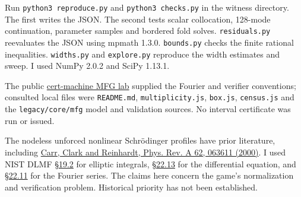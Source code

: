 \documentclass[11pt]{article}
\newcommand{\topic}[1]{\smallskip{\bfseries\sffamily\color{accent}#1}\par\nobreak}
\begin{document}
\topic{Code and sources}
Run \texttt{python3 reproduce.py} and \texttt{python3 checks.py} in the witness directory. The first writes the JSON. The second tests scalar collocation, 128-mode continuation, parameter samples and bordered fold solves. \texttt{residuals.py} reevaluates the JSON using mpmath 1.3.0. \texttt{bounds.py} checks the finite rational inequalities. \texttt{widths.py} and \texttt{explore.py} reproduce the width estimates and sweep. I used NumPy 2.0.2 and SciPy 1.13.1.

The public \href{https://github.com/carlostoledo1891/cert-machine/tree/main/labs/mfg}{cert-machine MFG lab} supplied the Fourier and verifier conventions; consulted local files were \texttt{README.md}, \texttt{multiplicity.js}, \texttt{box.js}, \texttt{census.js} and the \texttt{legacy/core/mfg} model and validation sources. No interval certificate was run or issued.

The nodeless unforced nonlinear Schrödinger profiles have prior literature, including \href{https://journals.aps.org/pra/abstract/10.1103/PhysRevA.62.063611}{Carr, Clark and Reinhardt, Phys. Rev. A 62, 063611 (2000)}. I used NIST DLMF \href{https://dlmf.nist.gov/19.2}{\S19.2} for elliptic integrals, \href{https://dlmf.nist.gov/22.13}{\S22.13} for the differential equation, and \href{https://dlmf.nist.gov/22.11}{\S22.11} for the Fourier series. The claims here concern the game's normalization and verification problem. Historical priority has not been established.
\end{document}

